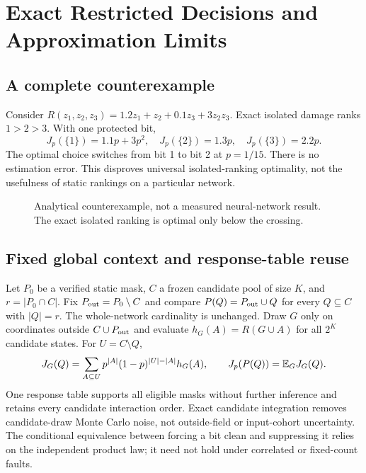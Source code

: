 \section{Exact Restricted Decisions and Approximation Limits}\label{sec:allocation}
\subsection{A complete counterexample}
Consider $R(z_1,z_2,z_3)=1.2z_1+z_2+0.1z_3+3z_2z_3$. Exact isolated damage ranks $1>2>3$. With one protected bit,
\begin{equation}\label{eq:counterexample}
J_p(\{1\})=1.1p+3p^2,\quad J_p(\{2\})=1.3p,\quad J_p(\{3\})=2.2p.
\end{equation}
The optimal choice switches from bit 1 to bit 2 at $p=1/15$. There is no estimation error. This disproves universal isolated-ranking optimality, not the usefulness of static rankings on a particular network.
\begin{figure}[t]
\centering
{}
\caption{Analytical counterexample, not a measured neural-network result. The exact isolated ranking is optimal only below the crossing.}\label{fig:counterexample}
\end{figure}

\subsection{Fixed global context and response-table reuse}
Let $P_0$ be a verified static mask, $C$ a frozen candidate pool of size $K$, and $r=|P_0\cap C|$. Fix $P_{\rm out}=P_0\setminus C$ and compare $P(Q)=P_{\rm out}\cup Q$ for every $Q\subseteq C$ with $|Q|=r$. The whole-network cardinality is unchanged. Draw $G$ only on coordinates outside $C\cup P_{\rm out}$ and evaluate $h_G(A)=R(G\cup A)$ for all $2^K$ candidate states. For $U=C\setminus Q$,
\begin{equation}\label{eq:exact-table}
J_G(Q)=\sum_{A\subseteq U}p^{|A|}(1-p)^{|U|-|A|}h_G(A),\qquad J_p(P(Q))=\mathbb{E}_G J_G(Q).
\end{equation}
One response table supports all eligible masks without further inference and retains every candidate interaction order. Exact candidate integration removes candidate-draw Monte Carlo noise, not outside-field or input-cohort uncertainty. The conditional equivalence between forcing a bit clean and suppressing it relies on the independent product law; it need not hold under correlated or fixed-count faults.


